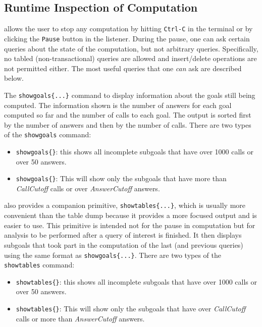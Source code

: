 
  \subsection{Runtime Inspection of Computation}\label{sec-runtime}

  \ERGO allows the user to stop any computation by hitting \texttt{Ctrl-C}
  in the terminal or by clicking the \texttt{Pause} button in the \ERGO
  listener.
  During the pause, one can ask certain queries about the state of the
  computation, but not arbitrary queries. Specifically, no tabled
  (non-transactional) queries are allowed and insert/delete operations are
  not permitted either.
  The most useful queries that one \emph{can} ask are described below.

  The \texttt{showgoals\{...\}} command to display information about 
  the goals still being computed. The information shown is the number of
  answers for each goal computed so far and the number of calls to each goal.
  The output is sorted first by the number of answers and then by the
  number of calls. There are two types of the \texttt{showgoals} command:
  \begin{itemize}
  \item    \texttt{showgoals\{\}}: this shows all incomplete subgoals that
    have over 1000 calls or over 50 answers.
  \item   \texttt{showgoals\{\}}:
    This will show only the subgoals that have more than \emph{CallCutoff} calls or
    over \emph{AnswerCutoff} answers.  
  \end{itemize}

  \ERGO also provides a companion primitive,  \texttt{showtables\{...\}},
  which is usually more convenient
  than the table dump because it provides a more focused output and is
  easier to use. This primitive is intended not for the pause in computation
  but for analysis to be performed
  after a query of interest is finished. It then displays subgoals
  that took part in the computation of the last (and previous queries)
  using the same format as \texttt{showgoals\{...\}}.
  There are two types of the \texttt{showtables} command:
  \begin{itemize}
  \item    \texttt{showtables\{\}}: this shows all incomplete subgoals that
    have over 1000 calls or over 50 answers.
  \item   \texttt{showtables\{\}}:
    This will show only the subgoals that have over \emph{CallCutoff} calls or
    more than \emph{AnswerCutoff} answers.  
  \end{itemize}

